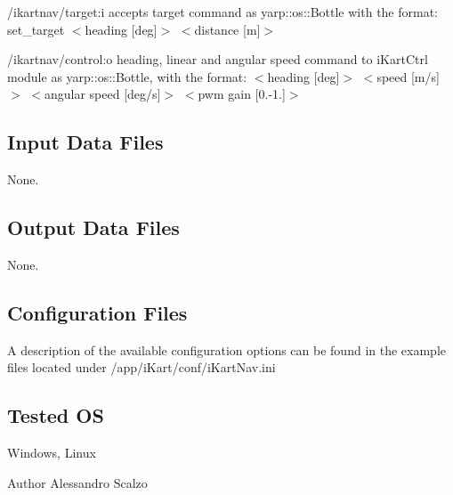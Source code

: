 \begin{DoxyItemize}
\item /ikartnav/target\+:i accepts target command as yarp\+::os\+::\+Bottle with the format\+: set\+\_\+target $<$heading \mbox{[}deg\mbox{]}$>$ $<$distance \mbox{[}m\mbox{]}$>$
\item /ikartnav/control\+:o heading, linear and angular speed command to i\+Kart\+Ctrl module as yarp\+::os\+::\+Bottle, with the format\+: $<$heading \mbox{[}deg\mbox{]}$>$ $<$speed \mbox{[}m/s\mbox{]}$>$ $<$angular speed \mbox{[}deg/s\mbox{]}$>$ $<$pwm gain \mbox{[}0.-\/1.\mbox{]}$>$
\end{DoxyItemize}\hypertarget{group__laserScannerGui_in_files_sec}{}\subsection{Input Data Files}\label{group__laserScannerGui_in_files_sec}
None.\hypertarget{group__laserScannerGui_out_data_sec}{}\subsection{Output Data Files}\label{group__laserScannerGui_out_data_sec}
None.\hypertarget{group__laserScannerGui_conf_file_sec}{}\subsection{Configuration Files}\label{group__laserScannerGui_conf_file_sec}
A description of the available configuration options can be found in the example files located under /app/i\+Kart/conf/i\+Kart\+Nav.ini\hypertarget{group__laserScannerGui_tested_os_sec}{}\subsection{Tested O\+S}\label{group__laserScannerGui_tested_os_sec}
Windows, Linux

\begin{DoxyAuthor}{Author}
Alessandro Scalzo 
\end{DoxyAuthor}
